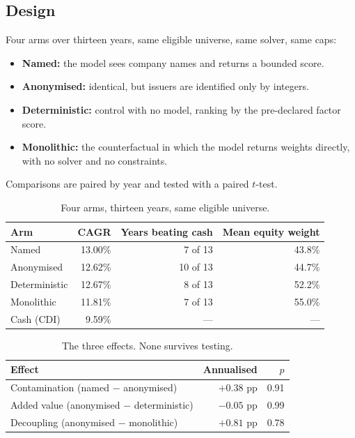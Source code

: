 \documentclass[10pt,conference]{IEEEtran}
\begin{document}
\subsection{Design}

Four arms over thirteen years, same eligible universe, same solver, same caps:

\begin{itemize}
\item \textbf{Named:} the model sees company names and returns a bounded score.
\item \textbf{Anonymised:} identical, but issuers are identified only by integers.
\item \textbf{Deterministic:} control with no model, ranking by the pre-declared factor score.
\item \textbf{Monolithic:} the counterfactual in which the model returns weights directly, with no solver and no constraints.
\end{itemize}

Comparisons are paired by year and tested with a paired $t$-test.

\begin{table}[t]
\caption{Four arms, thirteen years, same eligible universe.}
\centering
\begin{tabular}{lrrr}
\toprule
Arm & CAGR & Years beating cash & Mean equity weight \\
\midrule
Named & 13.00\% & 7 of 13 & 43.8\% \\
Anonymised & 12.62\% & 10 of 13 & 44.7\% \\
Deterministic & 12.67\% & 8 of 13 & 52.2\% \\
Monolithic & 11.81\% & 7 of 13 & 55.0\% \\
\midrule
Cash (CDI) & 9.59\% & --- & --- \\
\bottomrule
\end{tabular}
\label{tab:arms}
\end{table}

\begin{table}[t]
\caption{The three effects. None survives testing.}
\centering
\begin{tabular}{lrr}
\toprule
Effect & Annualised & $p$ \\
\midrule
Contamination (named $-$ anonymised) & $+0.38$ pp & 0.91 \\
Added value (anonymised $-$ deterministic) & $-0.05$ pp & 0.99 \\
Decoupling (anonymised $-$ monolithic) & $+0.81$ pp & 0.78 \\
\bottomrule
\end{tabular}
\label{tab:effects}
\end{table}
\end{document}
